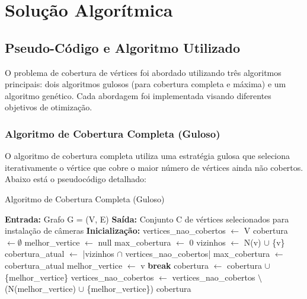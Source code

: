 \documentclass[12pt, a4paper]{report}
\begin{document}
\chapter{Solução Algorítmica}

\section{Pseudo-Código e Algoritmo Utilizado}
O problema de cobertura de vértices foi abordado utilizando três algoritmos principais: dois algoritmos gulosos (para cobertura completa e máxima) e um algoritmo genético. Cada abordagem foi implementada visando diferentes objetivos de otimização.

\subsection{Algoritmo de Cobertura Completa (Guloso)}
O algoritmo de cobertura completa utiliza uma estratégia gulosa que seleciona iterativamente o vértice que cobre o maior número de vértices ainda não cobertos. Abaixo está o pseudocódigo detalhado:

\begin{algorithm}[H]
\caption{Algoritmo de Cobertura Completa (Guloso)}
\begin{algorithmic}[1]
\State \textbf{Entrada:} Grafo G = (V, E)
\State \textbf{Saída:} Conjunto C de vértices selecionados para instalação de câmeras
\Statex
\State \textbf{Inicialização:}
\State vertices\_nao\_cobertos $\gets$ V
\State cobertura $\gets \emptyset$
\Statex
{}
    \State melhor\_vertice $\gets$ null
    \State max\_cobertura $\gets$ 0
            \State vizinhos $\gets$ N(v) $\cup$ \{v\} 
            \State cobertura\_atual $\gets$ |vizinhos $\cap$ vertices\_nao\_cobertos|
                \State max\_cobertura $\gets$ cobertura\_atual
                \State melhor\_vertice $\gets$ v
            \EndIf
        \EndIf
    \EndFor
        \State \textbf{break}
    \EndIf
    \State cobertura $\gets$ cobertura $\cup$ \{melhor\_vertice\}
    \State vertices\_nao\_cobertos $\gets$ vertices\_nao\_cobertos $\setminus$ (N(melhor\_vertice) $\cup$ \{melhor\_vertice\})
\EndWhile
\State \Return cobertura
\end{algorithmic}
\end{algorithm}
\end{document}
